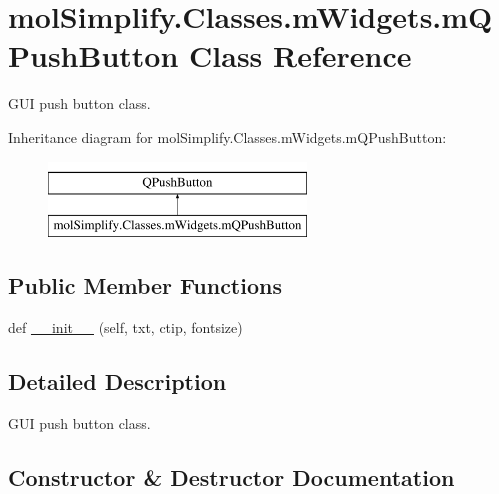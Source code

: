 \hypertarget{classmolSimplify_1_1Classes_1_1mWidgets_1_1mQPushButton}{}\section{mol\+Simplify.\+Classes.\+m\+Widgets.\+m\+Q\+Push\+Button Class Reference}
\label{classmolSimplify_1_1Classes_1_1mWidgets_1_1mQPushButton}


G\+UI push button class.  


Inheritance diagram for mol\+Simplify.\+Classes.\+m\+Widgets.\+m\+Q\+Push\+Button\+:\begin{figure}[H]
\begin{center}
\leavevmode
\includegraphics[height=2.000000cm]{classmolSimplify_1_1Classes_1_1mWidgets_1_1mQPushButton}
\end{center}
\end{figure}
\subsection*{Public Member Functions}
\begin{DoxyCompactItemize}
\item 
def \hyperlink{classmolSimplify_1_1Classes_1_1mWidgets_1_1mQPushButton_a814a6963cdc08ee2eb6e6db70182fd85}{\+\_\+\+\_\+init\+\_\+\+\_\+} (self, txt, ctip, fontsize)
\end{DoxyCompactItemize}


\subsection{Detailed Description}
G\+UI push button class. 

\subsection{Constructor \& Destructor Documentation}
\mbox{\label{classmolSimplify_1_1Classes_1_1mWidgets_1_1mQPushButton_a814a6963cdc08ee2eb6e6db70182fd85}} 
